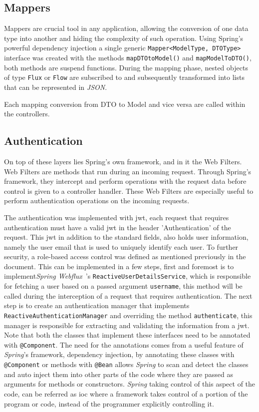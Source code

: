 \subsection{Mappers}

Mappers are crucial tool in any application, allowing the conversion of one data type into another and hiding the complexity of such operation. Using Spring's powerful dependency injection a single generic \texttt{Mapper<ModelType, DTOType>} interface was created with the methods \texttt{mapDTOtoModel()} and \texttt{mapModelToDTO()}, both methods are suspend functions.
During the mapping phase, nested objects of type \texttt{Flux} or \texttt{Flow} are subscribed to and subsequently transformed into lists that can be represented in \textit{JSON}.

Each mapping conversion from DTO to Model and vice versa are called within the controllers.


\subsection{Authentication}

On top of these layers lies Spring's own framework, and in it the Web Filters. Web Filters are methods that run during an incoming request. Through Spring's framework, they intercept and perform operations with the request data before control is given to a controller handler. 
These Web Filters are especially useful to perform authentication operations on the incoming requests.


The authentication was implemented with \acrfull{jwt}, each request that requires authentication must have a valid \acrshort{jwt} in the header 'Authentication' of the request. This \acrshort{jwt} in addition to the standard fields, also holds user information, namely the user email that is used to uniquely identify each user. 
To further security, a role-based access control was defined as mentioned previously in the document. This can be implemented in a few steps, first and foremost is to implement\textit{Spring Webflux}~\cite{spring-webflux}'s \texttt{ReactiveUserDetailsService}, which is responsible for fetching a user based on a passed argument \texttt{username}, this method will be called during the interception of a request that requires authentication. The next step is to create an authentication manager that implements \texttt{ReactiveAuthenticationManager} and overriding the method \texttt{authenticate}, this manager is responsible for extracting and validating the information from a \acrshort{jwt}. Note that both the classes that implement these interfaces need to be annotated with \texttt{@Component}. The need for the annotations comes from a useful feature of \textit{Spring}'s framework, dependency injection, by annotating these classes with \texttt{@Component} or methods with \texttt{@Bean} allows \textit{Spring} to scan and detect the classes and auto inject them into other parts of the code where they are passed as arguments for methods or constructors. \textit{Spring} taking control of this aspect of the code, can be referred as \acrfull{ioc} where a framework takes control of a portion of the program or code, instead of the programmer explicitly controlling it.
 
